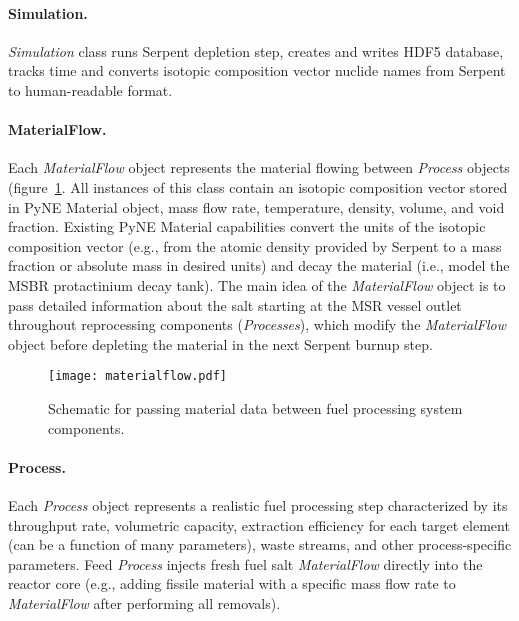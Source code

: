 \paragraph{Simulation.}\textit{Simulation} class runs Serpent depletion step, 
creates and writes HDF5 database, tracks time and converts isotopic 
composition vector nuclide names from Serpent to human-readable format.
\paragraph{MaterialFlow.}Each \textit{MaterialFlow} object represents the 
material flowing between \textit{Process} objects 
(figure~\ref{fig:matflow_obj}. All instances of this class 
contain an isotopic composition vector stored in PyNE Material object, mass 
flow rate, temperature, density, volume, and void fraction. Existing PyNE 
Material capabilities convert the units of the isotopic composition vector 
(e.g., from the atomic density provided by Serpent to a mass fraction or 
absolute mass in desired units) and decay the material (i.e., model the 
\gls{MSBR} protactinium decay tank). The main idea of the 
\textit{MaterialFlow} object is to pass detailed information about the salt 
starting at the \gls{MSR} vessel outlet throughout reprocessing components 
(\textit{Processes}), which modify the \textit{MaterialFlow} object before 
depleting the material in the next Serpent burnup step. 
\begin{figure}[ht!] %
	\centering
	\texttt{[image: materialflow.pdf]}
	\vspace{-0.1in}
	\caption{Schematic for passing material data between fuel processing 
	system components.}
	\label{fig:matflow_obj}
\end{figure}
\paragraph{Process.}Each \textit{Process} object represents a 
realistic fuel processing step characterized by its throughput rate, 
volumetric capacity, extraction efficiency for each target element (can be 
a function of many parameters), waste streams, and other process-specific 
parameters. Feed \textit{Process} injects fresh fuel salt 
\textit{MaterialFlow} directly into the reactor core (e.g., adding fissile 
material with a specific mass flow rate to \textit{MaterialFlow} after 
performing all removals).\\


